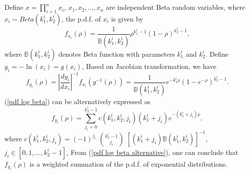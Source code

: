 \documentclass[12pt, draftclsnofoot, onecolumn]{IEEEtran}
\begin{document}
\section{}\label{proof pdf of OM}
Define $x=\prod_{i=1}^{n}x_{i}$,
$x_{1}, x_{2}, \ldots, x_{n}$ are independent Beta random variables, where $x_{i}\sim Beta(k_{1}^{i}, k_{2}^{i})$, the p.d.f. of $x_{i}$ is given by 
\begin{equation}
f_{x_{i}}(\rho)=\frac{1}{\mathbb{B}(k_{1}^{i}, k_{2}^{i})}\rho^{k_{1}^{i}-1}(1-\rho)^{k_{2}^{i}-1},
\label{pdf beta}
\end{equation}
where $\mathbb{B}(k^{i}_{1}, k_{2}^{i})$ denotes Beta function with parameters $k_{1}^{i}$ and $k_{2}^{i}$.
Define $y_{i}=-\ln(x_{i})=g(x_{i})$, Based on Jacobian transformation, we have 
\begin{equation}
f_{y_{i}}(\rho)=|\frac{dy_{i}}{dx_{i}}|^{-1}f_{x_{i}}(g^{-1}(\rho))=\frac{1}{\mathbb{B}(k_{1}^{i},k_{2}^{i})}e^{-k_{1}^{i}\rho}(1-e^{-\rho})^{k_{2}^{i}-1}.
\label{pdf log beta}
\end{equation}
(\ref{pdf log beta}) can be alternatively expressed as \cite{bhargava1981distribution}
\begin{equation}
f_{y_{i}}(\rho)=\sum_{j_{i}=0}^{k_{2}^{i}-1}c(k_{1}^{i},k_{2}^{i}, j_{i})(k_{1}^{i}+j_{i})e^{-(k_{1}^{i}+j_{i})\rho},
\label{pdf log beta alternative}
\end{equation} 
where $c(k_{1}^{i}, k_{2}^{i}, j_{i})=(-1)^{j_{i}}$ $k_{2}^{i}-1\choose j_{i}$ $[(k_{1}^{i}+j_{i})\mathbb{B}(k_{1}^{i},k_{2}^{i})]^{-1}$, $j_{i}\in [0,1,\ldots, k_{2}^{i}-1]$,
From (\ref{pdf log beta alternative}), one can conclude that $f_{y_{i}}(\rho)$ is a weighted summation of the p.d.f. of exponential distributions. 
\end{document}
